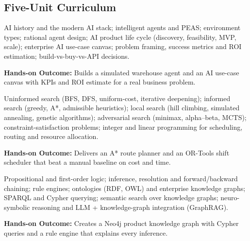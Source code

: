 \documentclass[10pt,a4paper]{article}
\begin{document}
\subsection*{Five-Unit Curriculum}
\begin{tcolorbox}[unitbox,title={{\color{gold}UNIT I}\quad Foundations of Intelligent Systems\hfill{\color{gold}9 Hours}}]\small AI history and the modern AI stack; intelligent agents and PEAS; environment types; rational agent design; AI product life cycle (discovery, feasibility, MVP, scale); enterprise AI use-case canvas; problem framing, success metrics and ROI estimation; build-vs-buy-vs-API decisions.\par\vspace{2pt}\par\textbf{Hands-on Outcome:} Builds a simulated warehouse agent and an AI use-case canvas with KPIs and ROI estimate for a real business problem.\end{tcolorbox}
\begin{tcolorbox}[unitbox,title={{\color{gold}UNIT II}\quad Search, Optimisation and Constraint Solving\hfill{\color{gold}9 Hours}}]\small Uninformed search (BFS, DFS, uniform-cost, iterative deepening); informed search (greedy, A*, admissible heuristics); local search (hill climbing, simulated annealing, genetic algorithms); adversarial search (minimax, alpha–beta, MCTS); constraint-satisfaction problems; integer and linear programming for scheduling, routing and resource allocation.\par\vspace{2pt}\par\textbf{Hands-on Outcome:} Delivers an A* route planner and an OR-Tools shift scheduler that beat a manual baseline on cost and time.\end{tcolorbox}
\begin{tcolorbox}[unitbox,title={{\color{gold}UNIT III}\quad Knowledge Representation and Reasoning\hfill{\color{gold}9 Hours}}]\small Propositional and first-order logic; inference, resolution and forward/backward chaining; rule engines; ontologies (RDF, OWL) and enterprise knowledge graphs; SPARQL and Cypher querying; semantic search over knowledge graphs; neuro-symbolic reasoning and LLM + knowledge-graph integration (GraphRAG).\par\vspace{2pt}\par\textbf{Hands-on Outcome:} Creates a Neo4j product knowledge graph with Cypher queries and a rule engine that explains every inference.\end{tcolorbox}
\end{document}

